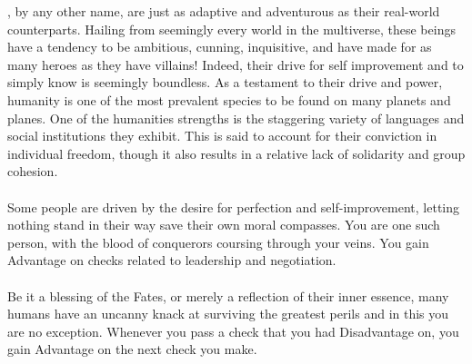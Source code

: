 %
, by any other name, are just as adaptive and adventurous as their real-world counterparts. 
Hailing from seemingly every world in the multiverse, these beings have a tendency to be ambitious, cunning, inquisitive, and have made for as many heroes as they have villains! 
Indeed, their drive for self improvement and to simply know is seemingly boundless. 
As a testament to their drive and power, humanity is one of the most prevalent species to be found on many planets and planes.
One of the humanities strengths is the staggering variety of languages and social institutions they exhibit. 
This is said to account for their conviction in individual freedom, though it also results in a relative lack of solidarity and group cohesion.
\\\\
 Some people are driven by the desire for perfection and self-improvement, letting nothing stand in their way save their own moral compasses. You are one such person, with the blood of conquerors coursing through your veins. You gain Advantage on checks related to leadership and negotiation.
\\\\
 Be it a blessing of the Fates, or merely a reflection of their inner essence, many humans have an uncanny knack at surviving the greatest perils and in this you are no exception. Whenever you pass a check that you had Disadvantage on, you gain Advantage on the next check you make.
%
\pagebreak\\
%
%

